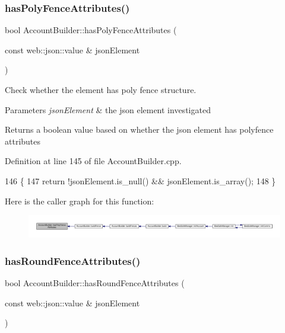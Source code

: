 \subsubsection{\texorpdfstring{has\+Poly\+Fence\+Attributes()}{hasPolyFenceAttributes()}}
{\footnotesize\ttfamily bool Account\+Builder\+::has\+Poly\+Fence\+Attributes (\begin{DoxyParamCaption}\item[{const web\+::json\+::value \&}]{json\+Element }\end{DoxyParamCaption})\hspace{0.3cm}{\ttfamily [private]}}

Check whether the element has poly fence structure.


\begin{DoxyParams}{Parameters}
{\em json\+Element} & the json element investigated \\
\hline
\end{DoxyParams}
\begin{DoxyReturn}{Returns}
a boolean value based on whether the json element has polyfence attributes 
\end{DoxyReturn}


Definition at line 145 of file Account\+Builder.\+cpp.


\begin{DoxyCode}
146 \{
147     \textcolor{keywordflow}{return} !jsonElement.is\_null() && jsonElement.is\_array();
148 \}
\end{DoxyCode}
Here is the caller graph for this function\+:
\nopagebreak
\begin{figure}[H]
\begin{center}
\leavevmode
\includegraphics[width=350pt]{d9/daa/class_account_builder_a426cb519ae4c5f0594f0f1e41e9f5a73_icgraph}
\end{center}
\end{figure}
\mbox{\label{class_account_builder_aea9045a135dac995cbf409b61c5850bf}} 
\subsubsection{\texorpdfstring{has\+Round\+Fence\+Attributes()}{hasRoundFenceAttributes()}}
{\footnotesize\ttfamily bool Account\+Builder\+::has\+Round\+Fence\+Attributes (\begin{DoxyParamCaption}\item[{const web\+::json\+::value \&}]{json\+Element }\end{DoxyParamCaption})\hspace{0.3cm}{\ttfamily [private]}}

